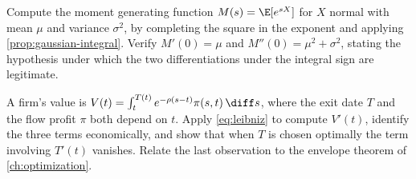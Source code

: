 \begin{exercise}\label{ex:int-2}
	Compute the moment generating function
	$M(s)=\E[e^{sX}]$ for $X$ normal with mean $\mu$ and variance $\sigma^2$, by
	completing the square in the exponent and applying
	\autoref{prop:gaussian-integral}. Verify $M'(0)=\mu$ and $M''(0)=\mu^2+\sigma^2$,
	stating the hypothesis under which the two differentiations under the integral
	sign are legitimate.
\end{exercise}

\begin{exercise}\label{ex:int-3}
	A firm's value is $V(t)=\int_t^{T(t)}e^{-\rho(s-t)}\pi(s,t)\,\diff s$, where the
	exit date $T$ and the flow profit $\pi$ both depend on $t$. Apply
	\eqref{eq:leibniz} to compute $V'(t)$, identify the three terms economically,
	and show that when $T$ is chosen optimally the term involving $T'(t)$ vanishes.
	Relate the last observation to the envelope theorem of
	\autoref{ch:optimization}.
\end{exercise}

